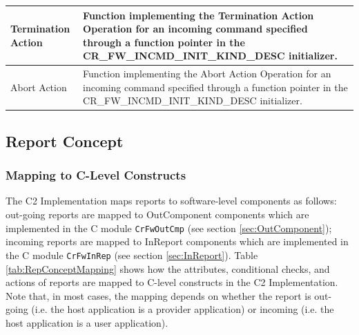 \documentclass[a4paper,10pt]{article}
\begin{document}
\begin{longtable}{|>{\raggedright}p{2.0cm}|p{9.3cm}|}
\hline
Termination Action & Function implementing the Termination Action Operation for an incoming command specified through a function pointer in the CR\_FW\_INCMD\_INIT\_KIND\_DESC initializer. \\
\hline
Abort Action & Function implementing the Abort Action Operation for an incoming command specified through a function pointer in the CR\_FW\_INCMD\_INIT\_KIND\_DESC initializer. \\
\hline
\end{longtable}


\subsection{Report Concept }\label{sec:RepConcept}


\subsubsection{Mapping to C-Level Constructs}\label{sec:RepConceptMapping}
The C2 Implementation maps reports to software-level components as follows: out-going reports are mapped to OutComponent components which are implemented in the C module \texttt{CrFwOutCmp} (see section \ref{sec:OutComponent}); incoming reports are mapped to InReport components which are implemented in the C module \texttt{CrFwInRep} (see section \ref{sec:InReport}). Table \ref{tab:RepConceptMapping} shows how the attributes, conditional checks, and actions of reports are mapped to C-level constructs in the C2 Implementation. Note that, in most cases, the mapping depends on whether the report is out-going (i.e. the host application is a provider application) or incoming (i.e. the host application is a user application).
\end{document}
